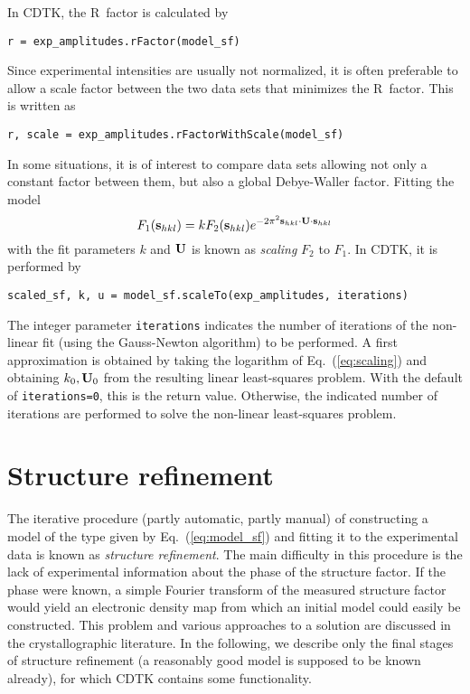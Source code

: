 \documentclass[12pt]{article}
\newcommand{\vect}[1]{{\bf #1}}
\newcommand{\mat}[1]{{\bf #1}}
\newcommand{\vs}{\vect{s}}
\newcommand{\mU}{\mat{U}}
\begin{document}
\begin{sloppy}
In CDTK, the R~factor is calculated by
\begin{verbatim}
r = exp_amplitudes.rFactor(model_sf)
\end{verbatim}
Since experimental intensities are usually not normalized, it is often
preferable to allow a scale factor between the two data sets that
minimizes the R~factor. This is written as
\begin{verbatim}
r, scale = exp_amplitudes.rFactorWithScale(model_sf)
\end{verbatim}

In some situations, it is of interest to compare data sets allowing not only
a constant factor between them, but also a global Debye-Waller factor.
Fitting the model
\begin{equation}
\label{eq:scaling}
F_1(\vs_{hkl}) = k F_2(\vs_{hkl}) e^{-2\pi^2 \vs_{hkl}\cdot\mU\cdot\vs_{hkl}}
\end{equation}
with the fit parameters $k$ and $\mU$ is known as \textit{scaling} $F_2$
to $F_1$. In CDTK, it is performed by
\begin{verbatim}
scaled_sf, k, u = model_sf.scaleTo(exp_amplitudes, iterations)
\end{verbatim}
The integer parameter \verb/iterations/ indicates the number of iterations
of the non-linear fit (using the Gauss-Newton algorithm) to be performed.
A first approximation is obtained by taking the logarithm of 
Eq.~(\ref{eq:scaling}) and obtaining $k_0, \mU_0$ from the resulting
linear least-squares problem. With the default of \verb/iterations=0/,
this is the return value. Otherwise, the indicated number of iterations
are performed to solve the non-linear least-squares problem.


\section{Structure refinement}

The iterative procedure (partly automatic, partly manual) of
constructing a model of the type given by Eq.~(\ref{eq:model_sf}) and
fitting it to the experimental data is known as \textit{structure
refinement}. The main difficulty in this procedure is the lack of
experimental information about the phase of the structure factor. If
the phase were known, a simple Fourier transform of the measured
structure factor would yield an electronic density map from which an
initial model could easily be constructed. This problem and various
approaches to a solution are discussed in the crystallographic
literature. In the following, we describe only the final stages of
structure refinement (a reasonably good model is supposed to be known
already), for which CDTK contains some functionality.


\end{sloppy}
\end{document}
